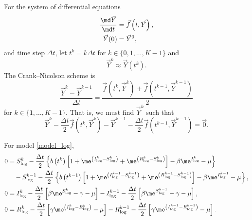 \documentclass{jpmarticle}
\begin{document}
For the system of differential equations
\begin{equation}
  \begin{split}
    \frac{\md \vec{Y}}{\md t}
    &= \vec{f}\left(t, \vec{Y}\right),
    \\
    \vec{Y}(0) &= \vec{Y}^0,
  \end{split}
\end{equation}
and time step $\Delta t$, let $t^k = k \Delta t$ for
$k \in \{0, 1, \ldots, K - 1\}$ and
\begin{equation}
  \vec{Y}^k \approx \vec{Y}(t^k).
\end{equation}
The Crank--Nicolson scheme is
\begin{equation}
  \frac{\vec{Y}^k - \vec{Y}^{k - 1}}{\Delta t}
  = \frac{
    \vec{f}\left(t^k, \vec{Y}^k\right)
    + \vec{f}\left(t^{k - 1}, \vec{Y}^{k - 1}\right)
  }{2}
\end{equation}
for $k \in \{1, \ldots, K - 1\}$.
That is, we must find $\vec{Y}^k$ such that
\begin{equation}
  \vec{Y}^k
  - \frac{\Delta t}{2}
  \vec{f}\left(t^k, \vec{Y}^k\right)
  - \vec{Y}^{k - 1}
  - \frac{\Delta t}{2}
  \vec{f}\left(t^{k - 1}, \vec{Y}^{k - 1}\right)
  = \vec{0}.
\end{equation}

For model \eqref{model_log},
\begin{equation}
  \begin{split}
    0 &=
    S_{\log}^k
    - \frac{\Delta t}{2} \left\{
      b\left(t^k\right)
      \left[
        1
        + \me^{\left(I_{\log}^k - S_{\log}^k\right)}
        + \me^{\left(R_{\log}^k - S_{\log}^k\right)}
      \right]
      - \beta \me^{I_{\log}^k}
      - \mu
    \right\}
    \\ & \quad {}
    - S_{\log}^{k - 1}
    - \frac{\Delta t}{2} \left\{
      b\left(t^{k - 1}\right)
      \left[
        1
        + \me^{\left(I_{\log}^{k - 1} - S_{\log}^{k - 1}\right)}
        + \me^{\left(R_{\log}^{k - 1} - S_{\log}^{k - 1}\right)}
      \right]
      - \beta \me^{I_{\log}^{k - 1}}
      - \mu
    \right\},
    \\
    0 &=
    I_{\log}^k
    - \frac{\Delta t}{2} \left[
      \beta \me^{S_{\log}^k}
      - \gamma - \mu
    \right]
    - I_{\log}^{k - 1}
    - \frac{\Delta t}{2} \left[
      \beta \me^{S_{\log}^{k - 1}}
      - \gamma - \mu
    \right],
    \\
    0 &=
    R_{\log}^k
    - \frac{\Delta t}{2} \left[
      \gamma \me^{\left(I_{\log}^k - R_{\log}^k\right)}
      - \mu
    \right]
    - R_{\log}^{k - 1}
    - \frac{\Delta t}{2} \left[
      \gamma \me^{\left(I_{\log}^{k - 1} - R_{\log}^{k - 1}\right)}
      - \mu
    \right].
  \end{split}
\end{equation}
\end{document}
